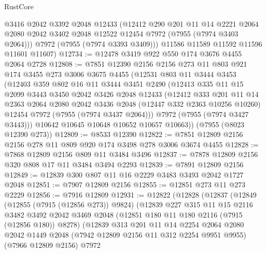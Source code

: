 \begin{lexlean}{RustCore}
\begin{coremodule}
        @3416
        @2042
        @3392
        @2048
        @12433
        (@12412
          @290
          @201
          @11
          @14
          @2221
          @2064
          @2080
          @2042
          @3402
          @2048
          @12522
          @12454
          @7972
          (@7955 (@7974 @3403 @2064)))
        @7972
        (@7955 (@7974 @3393 @3409)))
      @11586
      @11589
      @11592
      @11596
      @11601
      @11607)
@12734 := @12478 @3419 @922 @550 @174 @3676 @4455 @2064 @2728
@12808 := @7851
    @12390
    @2156
    @2156
    @273
    @11
    @803
    @921
    @174
    @3455
    @273
    @3006
    @3675
    @4455
    (@12531
      @803
      @11
      @3444
      @3453
      (@12403
        @359
        @802
        @16
        @11
        @3444
        @3451
        @2490
        (@12413
          @335
          @11
          @15
          @2099
          @3443
          @3450
          @2042
          @3426
          @2048
          @12433
          (@12412
            @333
            @201
            @11
            @14
            @2363
            @2064
            @2080
            @2042
            @3436
            @2048
            (@12447 @332 @2363 @10256 @10260)
            @12454
            @7972
            (@7955 (@7974 @3437 @2064)))
          @7972
          (@7955 (@7974 @3427 @3443)))
        @10642
        @10645
        @10648
        @10652
        @10657
        @10663))
    (@7955 (@8023 @12390 @273))
@12809 := @8533 @12390
@12822 := @7851 @12809 @2156 @2156 @278 @11 @809 @920 @174 @3498 @278 @3006 @3674 @4455
@12828 := @7868 @12809 @2156 @809 @11 @3484 @3496
@12837 := @7878 @12809 @2156 @320 @808 @17 @11 @3484 @3494 @2293
@12839 := @7891 @12809 @2156
@12849 := @12839 @300 @807 @11 @16 @2229 @3483 @3493 @2042 @1727 @2048
@12851 := @7907 @12809 @2156
@12855 := @12851 @273 @11 @273 @2229
@12856 := @7916 @12809
@12931 := @12822
    (@12828
      (@12837
        (@12849
          (@12855 (@7915 (@12856 @273)) @9824)
          (@12839
            @227
            @315
            @11
            @15
            @2116
            @3482
            @3492
            @2042
            @3469
            @2048
            (@12851 @180 @11 @180 @2116 (@7915 (@12856 @180)) @8278)
            (@12839
              @313
              @201
              @11
              @14
              @2254
              @2064
              @2080
              @2042
              @1449
              @2048
              (@7942 @12809 @2156 @11 @312 @2254 @9951 @9955)
              (@7966 @12809 @2156)
              @7972

\end{coremodule}
\end{lexlean}
